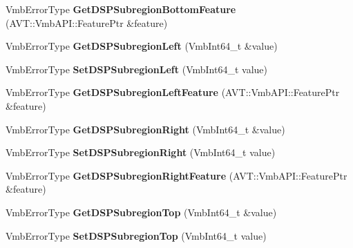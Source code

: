 \begin{DoxyCompactItemize}
\item 
\hypertarget{classMakoCamera_ad186316f7b2cfa8509e00584e37a430e}{Vmb\-Error\-Type {\bfseries Get\-D\-S\-P\-Subregion\-Bottom\-Feature} (A\-V\-T\-::\-Vmb\-A\-P\-I\-::\-Feature\-Ptr \&feature)}\label{classMakoCamera_ad186316f7b2cfa8509e00584e37a430e}

\item 
\hypertarget{classMakoCamera_a8d2015e5cb0e15e488549993e6722758}{Vmb\-Error\-Type {\bfseries Get\-D\-S\-P\-Subregion\-Left} (Vmb\-Int64\-\_\-t \&value)}\label{classMakoCamera_a8d2015e5cb0e15e488549993e6722758}

\item 
\hypertarget{classMakoCamera_a6733a0d7a0feaa2c6a1a0bd4ad7977eb}{Vmb\-Error\-Type {\bfseries Set\-D\-S\-P\-Subregion\-Left} (Vmb\-Int64\-\_\-t value)}\label{classMakoCamera_a6733a0d7a0feaa2c6a1a0bd4ad7977eb}

\item 
\hypertarget{classMakoCamera_ae365be3e77907b39788d75a36a13c83a}{Vmb\-Error\-Type {\bfseries Get\-D\-S\-P\-Subregion\-Left\-Feature} (A\-V\-T\-::\-Vmb\-A\-P\-I\-::\-Feature\-Ptr \&feature)}\label{classMakoCamera_ae365be3e77907b39788d75a36a13c83a}

\item 
\hypertarget{classMakoCamera_a08046bf9fd2000d7466d42b9795518db}{Vmb\-Error\-Type {\bfseries Get\-D\-S\-P\-Subregion\-Right} (Vmb\-Int64\-\_\-t \&value)}\label{classMakoCamera_a08046bf9fd2000d7466d42b9795518db}

\item 
\hypertarget{classMakoCamera_a157ed0e11f654a3aa5b319d905370ef4}{Vmb\-Error\-Type {\bfseries Set\-D\-S\-P\-Subregion\-Right} (Vmb\-Int64\-\_\-t value)}\label{classMakoCamera_a157ed0e11f654a3aa5b319d905370ef4}

\item 
\hypertarget{classMakoCamera_abb44a12d4259de806e41d55ae44f3718}{Vmb\-Error\-Type {\bfseries Get\-D\-S\-P\-Subregion\-Right\-Feature} (A\-V\-T\-::\-Vmb\-A\-P\-I\-::\-Feature\-Ptr \&feature)}\label{classMakoCamera_abb44a12d4259de806e41d55ae44f3718}

\item 
\hypertarget{classMakoCamera_ad9eb5f084ee71d6345db15488a280552}{Vmb\-Error\-Type {\bfseries Get\-D\-S\-P\-Subregion\-Top} (Vmb\-Int64\-\_\-t \&value)}\label{classMakoCamera_ad9eb5f084ee71d6345db15488a280552}

\item 
\hypertarget{classMakoCamera_ae4d42a938c096376fb042cbc83a4fcda}{Vmb\-Error\-Type {\bfseries Set\-D\-S\-P\-Subregion\-Top} (Vmb\-Int64\-\_\-t value)}\label{classMakoCamera_ae4d42a938c096376fb042cbc83a4fcda}


\end{DoxyCompactItemize}
